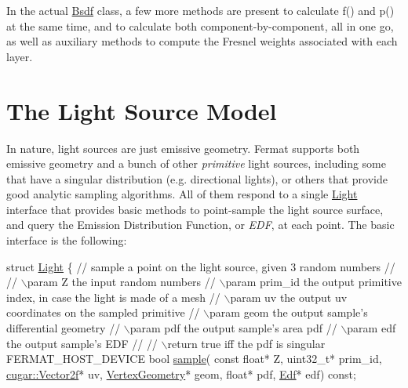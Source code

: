 \begin{DoxyParagraph}{}
In the actual \hyperlink{struct_bsdf}{Bsdf} class, a few more methods are present to calculate f() and p() at the same time, and to calculate both component-\/by-\/component, all in one go, as well as auxiliary methods to compute the Fresnel weights associated with each layer.
\end{DoxyParagraph}
\hypertarget{_overture_page_LightSection}{}\section{The Light Source Model}\label{_overture_page_LightSection}
\begin{DoxyParagraph}{}
In nature, light sources are just emissive geometry. Fermat supports both emissive geometry and a bunch of other {\itshape primitive} light sources, including some that have a singular distribution (e.\+g. directional lights), or others that provide good analytic sampling algorithms. All of them respond to a single \hyperlink{struct_light}{Light} interface that provides basic methods to point-\/sample the light source surface, and query the Emission Distribution Function, or {\itshape E\+DF}, at each point. The basic interface is the following\+: ~\newline

\begin{DoxyCode}
\textcolor{keyword}{struct }\hyperlink{struct_light}{Light}
\{
   \textcolor{comment}{// sample a point on the light source, given 3 random numbers}
   \textcolor{comment}{//}
   \textcolor{comment}{// \(\backslash\)param Z             the input random numbers}
   \textcolor{comment}{// \(\backslash\)param prim\_id       the output primitive index, in case the light is made of a mesh}
   \textcolor{comment}{// \(\backslash\)param uv            the output uv coordinates on the sampled primitive}
   \textcolor{comment}{// \(\backslash\)param geom          the output sample's differential geometry}
   \textcolor{comment}{// \(\backslash\)param pdf           the output sample's area pdf}
   \textcolor{comment}{// \(\backslash\)param edf           the output sample's EDF}
   \textcolor{comment}{//}
   \textcolor{comment}{// \(\backslash\)return true iff the pdf is singular}
   FERMAT\_HOST\_DEVICE
   \textcolor{keywordtype}{bool} \hyperlink{group___lights_module_ga67cc240bcda4b08efd26c8727144bf16}{sample}(
       \textcolor{keyword}{const} \textcolor{keywordtype}{float}*        Z,
       uint32\_t*           prim\_id,
       \hyperlink{structcugar_1_1_vector}{cugar::Vector2f}*    uv,
       \hyperlink{struct_vertex_geometry}{VertexGeometry}*     geom,
       \textcolor{keywordtype}{float}*              pdf,
       \hyperlink{struct_edf}{Edf}*                edf) \textcolor{keyword}{const};


\end{DoxyCode}
\end{DoxyParagraph}
